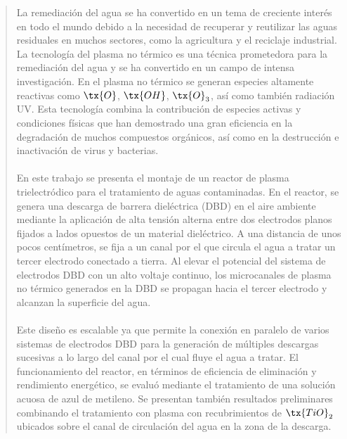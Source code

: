 
\begin{abstract} \NS
La remediación del agua se ha convertido en un tema de creciente interés en todo el mundo debido a la necesidad de recuperar y reutilizar las aguas residuales en muchos sectores, como la agricultura y el reciclaje industrial. La tecnología del plasma no térmico es una técnica prometedora para la remediación del agua y se ha convertido en un campo de intensa investigación. En el plasma no térmico se generan especies altamente reactivas como $\tx{O}$, $\tx{OH}$, $\tx{O}_3$, así como también radiación UV. Esta tecnología combina la contribución de especies activas y condiciones físicas que han demostrado una gran eficiencia en la degradación de muchos compuestos orgánicos, así como en la destrucción e inactivación de virus y bacterias. \\\\
En este trabajo se presenta el montaje de un reactor de plasma trielectródico para el tratamiento de aguas contaminadas. En el reactor, se genera una descarga de barrera dieléctrica (DBD) en el aire ambiente mediante la aplicación de alta tensión alterna entre dos electrodos planos fijados a lados opuestos de un material dieléctrico. A una distancia de unos pocos centímetros, se fija a un canal por el que circula el agua a tratar un tercer electrodo conectado a tierra. Al elevar el potencial del sistema de electrodos DBD con un alto voltaje continuo, los microcanales de plasma no térmico generados en la DBD se propagan hacia el tercer electrodo y alcanzan la superficie del agua. \\\\
Este diseño es escalable ya que permite la conexión en paralelo de varios sistemas de electrodos DBD para la generación de múltiples descargas sucesivas a lo largo del canal por el cual fluye el agua a tratar. El funcionamiento del reactor, en términos de eficiencia de eliminación y rendimiento energético, se evaluó mediante el tratamiento de una solución acuosa de azul de metileno. Se presentan también resultados preliminares combinando el tratamiento con plasma con recubrimientos de $\tx{TiO}_2$ ubicados sobre el canal de circulación del agua en la zona de la descarga.
\end{abstract}
